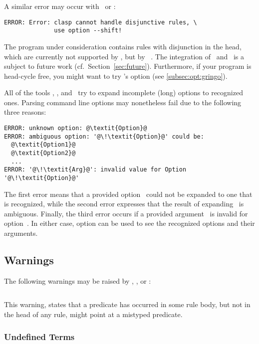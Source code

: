 A similar error may occur with \clingo\ or \iclingo:
%
\begin{lstlisting}[numbers=none,escapechar=@]
ERROR: Error: clasp cannot handle disjunctive rules, \
              use option --shift!
\end{lstlisting}
%
The program under consideration contains rules with disjunction in the head,
which are currently not supported by \clasp,
but by \claspD~\cite{drgegrkakoossc08a}.
The integration of \clasp\ and \claspD\ is a subject to future work
(cf.\ Section~\ref{sec:future}).
Furthermore, if your program is head-cycle free, 
you might want to try \gringo's  option (see \ref{subsec:opt:gringo}).

All of the tools \gringo, \clasp, and \clingo\
try to expand incomplete (long) options to recognized ones.
Parsing command line options may nonetheless fail due to the following three reasons:
%
\begin{lstlisting}[numbers=none,escapechar=@]
ERROR: unknown option: @\textit{Option}@
ERROR: ambiguous option: '@\!\textit{Option}@' could be:
  @\textit{Option1}@
  @\textit{Option2}@
  ...
ERROR: '@\!\textit{Arg}@': invalid value for Option '@\!\textit{Option}@'
\end{lstlisting}
%
The first error means that a provided option~
could not be expanded to one that is recognized,
while the second error expresses that the result of expanding~
is ambiguous.
Finally, the third error occurs if a provided argument~\code{\textit{Arg}}
is invalid for option~.
In either case, option \code{--help} can be used to see 
the recognized options and their arguments.


\subsection{Warnings}\label{subsec:warn}

The following warnings may be raised by \gringo, \clingo, or \iclingo:
%
\begin{lstlisting}[numbers=none,escapechar=@]
% warning: @\textit{p}@/@\!\textit{i}@ is never defined
\end{lstlisting}
%
This warning, states that a predicate 
has occurred in some rule body, but not in the head of any rule,
might point at a mistyped predicate.

\subsubsection{Undefined Terms}\label{sec:warn:undefterm}
\tbf

